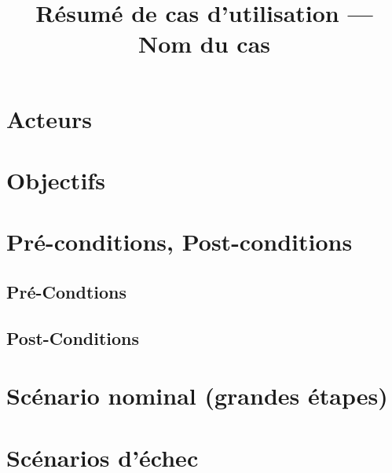 \documentclass[12pt,a4paper]{article}
\title{Résumé de cas d'utilisation --- Nom du cas} %
\date{} %
\author{} %
\begin{document}
        \maketitle

        \section{Acteurs}

        \section{Objectifs}

        \section{Pré-conditions, Post-conditions}

            \subsection{Pré-Condtions}

            \subsection{Post-Conditions}

        \section{Scénario nominal (grandes étapes)}

        \section{Scénarios d'échec}

    
\end{document}
